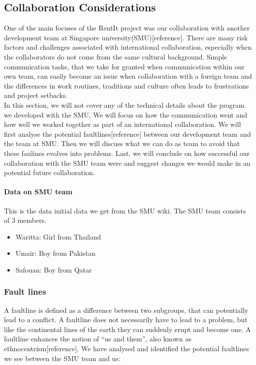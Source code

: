 \documentclass[a4paper,11pt,report]{article}
\begin{document}
\subsection{Collaboration Considerations}
One of the main focuses of the RentIt project was our collaboration with another development team at Singapore university(SMU)[reference]. There are many risk factors and challenges associated with international collaboration, especially when the collaborators do not come from the same cultural background. Simple communication tasks, that we take for granted when communication within our own team, can easily become an issue when collaboration with a foreign team and the differences in work routines, traditions and culture often leads to frustrations and project setbacks. \\

In this section, we will not cover any of the technical details about the program we developed with the SMU. We will focus on how the communication went and how well we worked together as part of an international collaboration. We will first analyse the potential faultlines[reference] between our development team and the team at SMU. Then we will discuss what we can do as team to avoid that these faulines evolves into problems. Last, we will conclude on how successful our collaboration with the SMU team were and suggest changes we would make in an potential future collaboration.\\

\paragraph{Data on SMU team}

This is the data initial data we get from the SMU wiki. The SMU team consists of 3 members.\\

\begin{itemize}
\item Waritta: Girl from Thailand
\item Umair: Boy from Pakistan
\item Safouan: Boy from Qatar
\end{itemize}

\subsubsection{Fault lines}
A faultline is defined as a difference between two subgroups, that can potentially lead to a conflict. A faultline does not necessarily have to lead to a problem, but like the continental lines of the earth they can suddenly erupt and become one. A faultline enhances the notion of “us and them”, also known as ethnocentrism[reference]. We have analysed and identified the potential faultlines we see between the SMU team and us:
\end{document}
